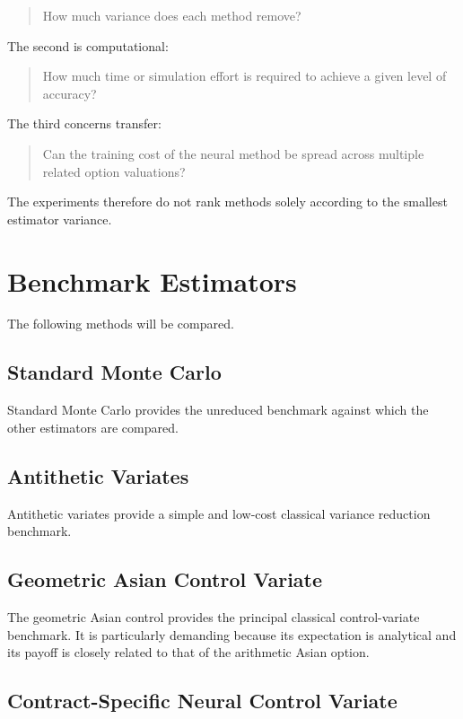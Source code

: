 \documentclass[12pt,a4paper]{report}
\begin{document}
\begin{quote}
How much variance does each method remove?
\end{quote}

The second is computational:

\begin{quote}
How much time or simulation effort is required to achieve a given level of accuracy?
\end{quote}

The third concerns transfer:

\begin{quote}
Can the training cost of the neural method be spread across multiple related option valuations?
\end{quote}

The experiments therefore do not rank methods solely according to the smallest estimator variance.

\section{Benchmark Estimators}

The following methods will be compared.

\subsection{Standard Monte Carlo}

Standard Monte Carlo provides the unreduced benchmark against which the other estimators are compared.

\subsection{Antithetic Variates}

Antithetic variates provide a simple and low-cost classical variance reduction benchmark.

\subsection{Geometric Asian Control Variate}

The geometric Asian control provides the principal classical control-variate benchmark. It is particularly demanding because its expectation is analytical and its payoff is closely related to that of the arithmetic Asian option.

\subsection{Contract-Specific Neural Control Variate}
\end{document}
